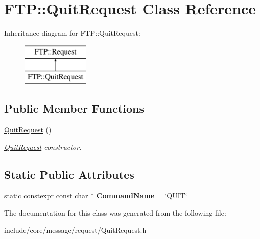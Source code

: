 \hypertarget{class_f_t_p_1_1_quit_request}{\section{F\-T\-P\-:\-:Quit\-Request Class Reference}
\label{class_f_t_p_1_1_quit_request}
}
Inheritance diagram for F\-T\-P\-:\-:Quit\-Request\-:\begin{figure}[H]
\begin{center}
\leavevmode
\includegraphics[height=2.000000cm]{class_f_t_p_1_1_quit_request}
\end{center}
\end{figure}
\subsection*{Public Member Functions}
\begin{DoxyCompactItemize}
\item 
\hypertarget{class_f_t_p_1_1_quit_request_ac4485b43c00501183cea0eaea01e7349}{\hyperlink{class_f_t_p_1_1_quit_request_ac4485b43c00501183cea0eaea01e7349}{Quit\-Request} ()}\label{class_f_t_p_1_1_quit_request_ac4485b43c00501183cea0eaea01e7349}

\begin{DoxyCompactList}\small\item\em \hyperlink{class_f_t_p_1_1_quit_request}{Quit\-Request} constructor. \end{DoxyCompactList}\end{DoxyCompactItemize}
\subsection*{Static Public Attributes}
\begin{DoxyCompactItemize}
\item 
\hypertarget{class_f_t_p_1_1_quit_request_ad454c5249faa90ecec425af2ca5a6405}{static constexpr const char $\ast$ {\bfseries Command\-Name} = \char`\"{}Q\-U\-I\-T\char`\"{}}\label{class_f_t_p_1_1_quit_request_ad454c5249faa90ecec425af2ca5a6405}

\end{DoxyCompactItemize}


The documentation for this class was generated from the following file\-:\begin{DoxyCompactItemize}
\item 
include/core/message/request/Quit\-Request.\-h\end{DoxyCompactItemize}
